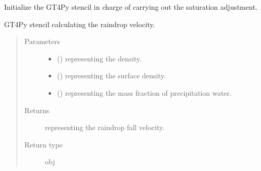 \documentclass[letterpaper,10pt,english]{sphinxmanual}
\begin{document}
\begin{fulllineitems}
\begin{fulllineitems}
\label{\detokenize{api:parameterizations.adjustment_microphysics_kessler_wrf_saturation.AdjustmentMicrophysicsKesslerWRFSaturation._stencil_adjustment_initialize}}
Initialize the GT4Py stencil in charge of carrying out the saturation adjustment.

\end{fulllineitems}


\begin{fulllineitems}
\label{\detokenize{api:parameterizations.adjustment_microphysics_kessler_wrf_saturation.AdjustmentMicrophysicsKesslerWRFSaturation._stencil_raindrop_fall_velocity_defs}}
GT4Py stencil calculating the raindrop velocity.
\begin{quote}\begin{description}
\item[{Parameters}] \leavevmode\begin{itemize}
\item {} 
 () \textendash{}  representing the density.

\item {} 
 () \textendash{}  representing the surface density.

\item {} 
 () \textendash{}  representing the mass fraction of precipitation water.

\end{itemize}

\item[{Returns}] \leavevmode
{} representing the raindrop fall velocity.

\item[{Return type}] \leavevmode
obj

\end{description}\end{quote}


\end{fulllineitems}
\end{fulllineitems}
\end{document}
